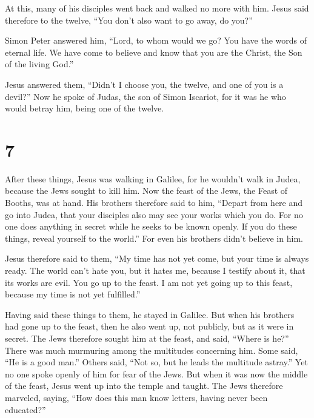  At this, many of his disciples went back and walked no
more with him.  Jesus said therefore to the twelve, ``You
don't also want to go away, do you?''

 Simon Peter answered him, ``Lord, to whom would we go?
You have the words of eternal life.  We have come to
believe and know that you are the Christ, the Son of the living God.''

 Jesus answered them, ``Didn't I choose you, the twelve,
and one of you is a devil?''  Now he spoke of Judas, the
son of Simon Iscariot, for it was he who would betray him, being one of
the twelve.

\hypertarget{section-6}{%
\section{7}\label{section-6}}

 After these things, Jesus was walking in Galilee, for he
wouldn't walk in Judea, because the Jews sought to kill him.
 Now the feast of the Jews, the Feast of Booths, was at
hand.  His brothers therefore said to him, ``Depart from
here and go into Judea, that your disciples also may see your works
which you do.  For no one does anything in secret while he
seeks to be known openly. If you do these things, reveal yourself to the
world.''  For even his brothers didn't believe in him.

 Jesus therefore said to them, ``My time has not yet come,
but your time is always ready.  The world can't hate you,
but it hates me, because I testify about it, that its works are evil.
 You go up to the feast. I am not yet going up to this
feast, because my time is not yet fulfilled.''

 Having said these things to them, he stayed in Galilee.
 But when his brothers had gone up to the feast, then he
also went up, not publicly, but as it were in secret. 
The Jews therefore sought him at the feast, and said, ``Where is he?''
 There was much murmuring among the multitudes concerning
him. Some said, ``He is a good man.'' Others said, ``Not so, but he
leads the multitude astray.''  Yet no one spoke openly of
him for fear of the Jews.  But when it was now the middle
of the feast, Jesus went up into the temple and taught. 
The Jews therefore marveled, saying, ``How does this man know letters,
having never been educated?''

